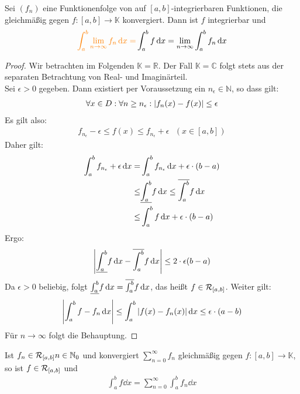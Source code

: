 \begin{Satz}{\label{vl_18_satz_2}
	Sei $(f_n)$ eine Funktionenfolge von auf $[a,b]$-integrierbaren Funktionen, 
	die gleichmäßig gegen $f:[a,b] \rightarrow \mathbb{K}$ konvergiert. Dann ist 
	$f$ integrierbar und 
	\begin{align*}
		\textcolor{orange}{\int_a^b \lim\limits_{n \rightarrow  \infty}{f_n \dd{x}} =}		
		\int_a^b f \dd{x} = \lim\limits_{n \rightarrow \infty} \int_a^b f_n \dd{x}
	\end{align*}
}\end{Satz}
\begin{proof}
	Wir betrachten im Folgenden $\mathbb{K} = \mathbb{R}$. Der Fall $\mathbb{K} 
	= \mathbb{C}$ folgt stets aus der separaten Betrachtung von Real- und 
	Imaginärteil. \\
	Sei $\epsilon > 0$ gegeben. Dann existiert per Voraussetzung ein $n_{\epsilon} 
	\in \mathbb{N}$, so dass gilt:
	\begin{align*}
		\forall x \in D: \forall n \geq n_{\epsilon} : \abs{f_n(x) - f(x) } \leq 
		\epsilon
	\end{align*}
	Es gilt also: 
	\begin{align*}
		f_{n_{\epsilon}} - \epsilon \leq f(x) \leq f_{n_{\epsilon}} + \epsilon 
		\text{ }(x \in [a,b])
	\end{align*}		
	Daher gilt:
	\begin{align*}
		\int_a^b f_{n_{\epsilon}} + \epsilon \dd{x} 
		= & \int_a^b f_{n_{\epsilon}} \dd{x} + \epsilon \cdot (b-a) \\
		\leq & \underline{\int_{a}^{b}} f \dd{x} \leq \overline{\int_{a}^{b}} f \dd{x} \\
		\leq & \int_a^b f\dd{x} + \epsilon\cdot (b-a)
	\end{align*}
	Ergo:
	\begin{align*}
		\abs{\underline{\int_{a}^{b}} f \dd{x} - \overline{\int_{a}^{b}} f \dd{x} } \leq 2 \cdot \epsilon (b-a)
	\end{align*}
	Da $\epsilon > 0$ beliebig, folgt $\underline{\int_{a}^{b}} f \dd{x} = \overline{\int_{a}^{b}} f \dd{x}$, 
	das heißt $f \in \mathcal{R}_{[{a},{b}]}$.
	Weiter gilt:
	\begin{align*}
		\abs{ \int_a^b f - f_n \dd{x} } \leq \int_a^b \abs{ f(x) - f_n(x) }\dd{x}
		\leq \epsilon\cdot (a-b)
	\end{align*}
	Für $n \rightarrow \infty$ folgt die Behauptung.
\end{proof}

\begin{Korollar}{
	Ist $f_n \in \mathcal{R}_{[{a},{b}]} n \in \mathbb{N}_0$ und konvergiert 
	$\sum_{n = 0}^{\infty} f_n$ gleichmäßig gegen $f: [a,b] \rightarrow \mathbb{K}$, 
	so ist $f \in \mathcal{R}_{[{a},{b}]}$ und 
	\begin{align*}
		\int_a^b f\dd{x} = \sum_{n=0}^{\infty} \int_a^b f_n \dd{x}
	\end{align*}
}\end{Korollar}

